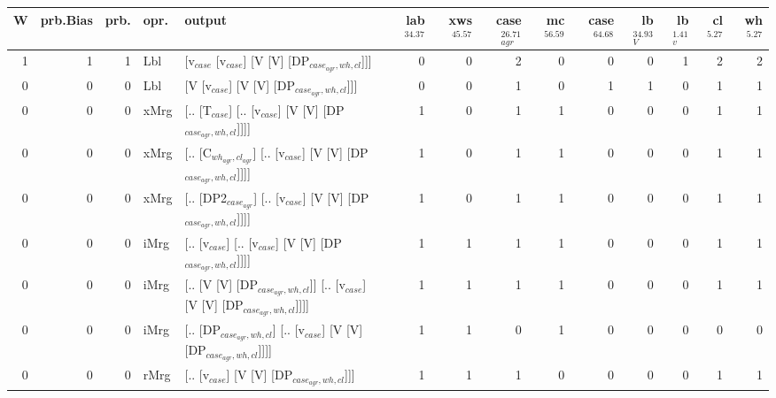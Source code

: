 \begin{tabularx}{\linewidth}{rrrlXrrrrrrrrr}
\hline
   W &   prb.Bias &   prb. & opr.   & output                                                                     &   lab$^{34.37}$ &   xws$^{45.57}$ &   case$_{agr}^{26.71}$ &   mc$^{56.59}$ &   case$^{64.68}$ &   lb$_{V}^{34.93}$ &   lb$_{v}^{1.41}$ &   cl$^{5.27}$ &   wh$^{5.27}$ \\
\hline
   1 &       1 &   1 & Lbl  & [v$_{case}$ [v$_{case}$] [V [V] [DP$_{case_{agr},wh,cl}$]]]                              &             0 &             0 &                  2 &            0 &              0 &              0 &             1 &        2 &        2 \\
   0 &       0 &   0 & Lbl  & [V [v$_{case}$] [V [V] [DP$_{case_{agr},wh,cl}$]]]                                   &             0 &             0 &                  1 &            0 &              1 &              1 &             0 &        1 &        1 \\
   0 &       0 &   0 & xMrg & [.. [T$_{case}$] [.. [v$_{case}$] [V [V] [DP$_{case_{agr},wh,cl}$]]]]                    &             1 &             0 &                  1 &            1 &              0 &              0 &             0 &        1 &        1 \\
   0 &       0 &   0 & xMrg & [.. [C$_{wh_{agr},cl_{agr}}$] [.. [v$_{case}$] [V [V] [DP$_{case_{agr},wh,cl}$]]]]           &             1 &             0 &                  1 &            1 &              0 &              0 &             0 &        1 &        1 \\
   0 &       0 &   0 & xMrg & [.. [DP2$_{case_{agr}}$] [.. [v$_{case}$] [V [V] [DP$_{case_{agr},wh,cl}$]]]]              &             1 &             0 &                  1 &            1 &              0 &              0 &             0 &        1 &        1 \\
   0 &       0 &   0 & iMrg & [.. [v$_{case}$] [.. [v$_{case}$] [V [V] [DP$_{case_{agr},wh,cl}$]]]]                    &             1 &             1 &                  1 &            1 &              0 &              0 &             0 &        1 &        1 \\
   0 &       0 &   0 & iMrg & [.. [V [V] [DP$_{case_{agr},wh,cl}$]] [.. [v$_{case}$] [V [V] [DP$_{case_{agr},wh,cl}$]]]] &             1 &             1 &                  1 &            1 &              0 &              0 &             0 &        1 &        1 \\
   0 &       0 &   0 & iMrg & [.. [DP$_{case_{agr},wh,cl}$] [.. [v$_{case}$] [V [V] [DP$_{case_{agr},wh,cl}$]]]]         &             1 &             1 &                  0 &            1 &              0 &              0 &             0 &        0 &        0 \\
   0 &       0 &   0 & rMrg & [.. [v$_{case}$] [V [V] [DP$_{case_{agr},wh,cl}$]]]                                  &             1 &             1 &                  1 &            0 &              0 &              0 &             0 &        1 &        1 \\
\hline
\end{tabularx}\endgroup\\
